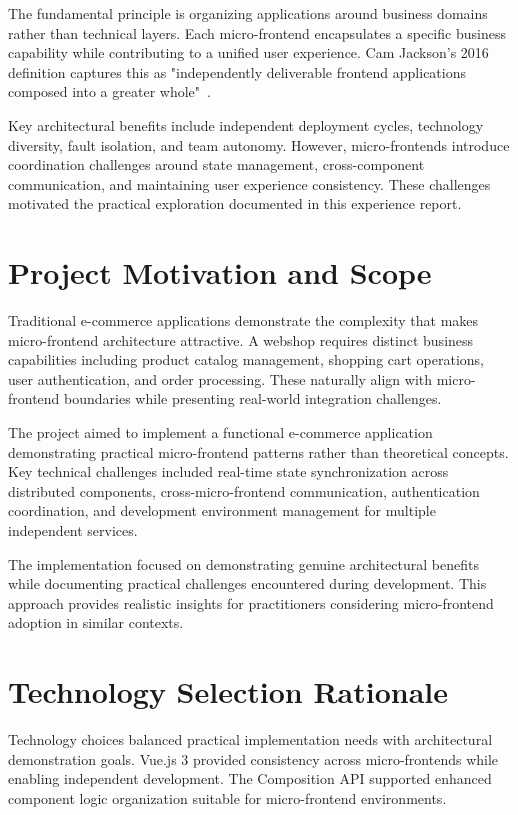 \documentclass[12pt,a4paper]{report}
\begin{document}
The fundamental principle is organizing applications around business domains rather than technical layers. Each micro-frontend encapsulates a specific business capability while contributing to a unified user experience. Cam Jackson's 2016 definition captures this as "independently deliverable frontend applications composed into a greater whole"~\cite{jackson2016microfrontends}.

Key architectural benefits include independent deployment cycles, technology diversity, fault isolation, and team autonomy. However, micro-frontends introduce coordination challenges around state management, cross-component communication, and maintaining user experience consistency. These challenges motivated the practical exploration documented in this experience report.

\section{Project Motivation and Scope}

Traditional e-commerce applications demonstrate the complexity that makes micro-frontend architecture attractive. A webshop requires distinct business capabilities including product catalog management, shopping cart operations, user authentication, and order processing. These naturally align with micro-frontend boundaries while presenting real-world integration challenges.

The project aimed to implement a functional e-commerce application demonstrating practical micro-frontend patterns rather than theoretical concepts. Key technical challenges included real-time state synchronization across distributed components, cross-micro-frontend communication, authentication coordination, and development environment management for multiple independent services.

The implementation focused on demonstrating genuine architectural benefits while documenting practical challenges encountered during development. This approach provides realistic insights for practitioners considering micro-frontend adoption in similar contexts.

\section{Technology Selection Rationale}

Technology choices balanced practical implementation needs with architectural demonstration goals. Vue.js 3 provided consistency across micro-frontends while enabling independent development. The Composition API supported enhanced component logic organization suitable for micro-frontend environments.
\end{document}
